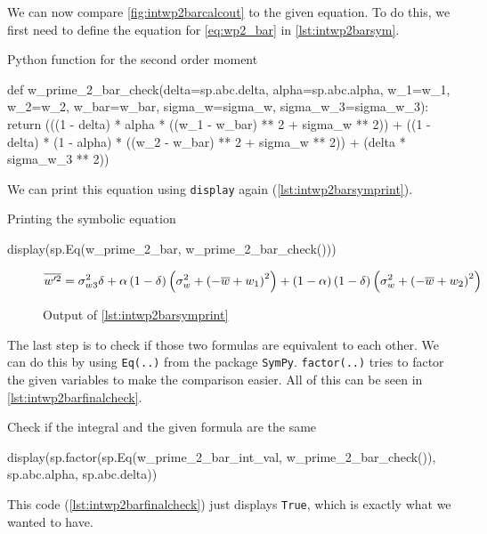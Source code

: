 We can now compare \cref{fig:intwp2barcalcout} to the given equation.
To do this, we first need to define the equation for \cref{eq:wp2_bar} in \cref{lst:intwp2barsym}.
\begin{listing}[!ht]
    \caption{Python function for the second order moment}
    \label{lst:intwp2barsym}
    \begin{pythoncode}
        def w_prime_2_bar_check(delta=sp.abc.delta, alpha=sp.abc.alpha, w_1=w_1, w_2=w_2, w_bar=w_bar, sigma_w=sigma_w, sigma_w_3=sigma_w_3):
            return (((1 - delta) * alpha * ((w_1 - w_bar) ** 2 + sigma_w ** 2))
                + ((1 - delta) * (1 - alpha) * ((w_2 - w_bar) ** 2 + sigma_w ** 2))
                + (delta * sigma_w_3 ** 2))
    \end{pythoncode}
\end{listing}
We can print this equation using \texttt{display} again (\cref{lst:intwp2barsymprint}).
\begin{listing}[!ht]
    \caption{Printing the symbolic equation}
    \label{lst:intwp2barsymprint}
    \begin{pythoncode}
        display(sp.Eq(w_prime_2_bar, w_prime_2_bar_check()))
    \end{pythoncode}
\end{listing}
\begin{figure}[!ht]
    \centering
    \caption{Output of \cref{lst:intwp2barsymprint}}
    \label{fig:intwp2barsymprintout}
    \begin{align}
        \nonumber
        \overline{w'^2}
        = \sigma_{w3}^{2} \delta + \alpha \left(1 - \delta\right)
        \left(\sigma_{w}^{2} + \left(- \overline{w} + w_{1}\right)^{2}\right) +
        \left(1 -\alpha\right) \left(1 - \delta\right) \left(\sigma_{w}^{2} +
        \left(- \overline{w} + w_{2}\right)^{2}\right)
    \end{align}
\end{figure}
The last step is to check if those two formulas are equivalent to each other.
We can do this by using \texttt{Eq(..)} from the package \texttt{SymPy}.
\texttt{factor(..)} tries to factor the given variables to make the comparison easier.
All of this can be seen in \cref{lst:intwp2barfinalcheck}.
\begin{listing}[!ht]
    \caption{Check if the integral and the given formula are the same}
    \label{lst:intwp2barfinalcheck}
    \begin{pythoncode}
        display(sp.factor(sp.Eq(w_prime_2_bar_int_val, w_prime_2_bar_check()), sp.abc.alpha, sp.abc.delta))
    \end{pythoncode}
\end{listing}
This code (\cref{lst:intwp2barfinalcheck}) just displays \texttt{True},
which is exactly what we wanted to have.


